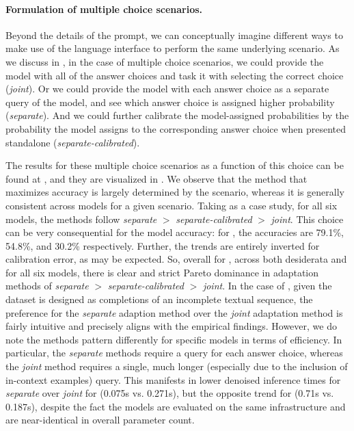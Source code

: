 \paragraph{Formulation of multiple choice scenarios.}
Beyond the details of the prompt, we can conceptually imagine different ways to make use of the language interface to perform the same underlying scenario.
As we discuss in , in the case of multiple choice scenarios, we could provide the model with all of the answer choices and task it with selecting the correct choice (\textit{joint}).
Or we could provide the model with each answer choice as a separate query of the model, and see which answer choice is assigned higher probability (\textit{separate}).
And we could further calibrate the model-assigned probabilities by the probability the model assigns to the corresponding answer choice when presented standalone (\textit{separate-calibrated}).

The results for these multiple choice scenarios as a function of this choice can be found at , and they are visualized in .
We observe that the method that maximizes accuracy is largely determined by the scenario, whereas it is generally consistent across models for a given scenario.
Taking \hellaswag as a case study, for all six models, the methods follow \textit{separate} $>$ \textit{separate-calibrated} $>$ \textit{joint}.
This choice can be very consequential for the model accuracy: for \optonesevenfive, the accuracies are 79.1\%, 54.8\%, and 30.2\% respectively. 
Further, the trends are entirely inverted for calibration error, as may be expected.
So, overall for \hellaswag, across both desiderata and for all six models, there is clear and strict Pareto dominance in adaptation methods of \textit{separate} $>$ \textit{separate-calibrated} $>$ \textit{joint}.
In the case of \hellaswag, given the dataset is designed as completions of an incomplete textual sequence, the preference for the \textit{separate} adaption method over the \textit{joint} adaptation method is fairly intuitive and precisely aligns with the empirical findings. 
However, we do note the methods pattern differently for specific models in terms of efficiency.
In particular, the \textit{separate} methods require a query for each answer choice, whereas the \textit{joint} method requires a single, much longer (especially due to the inclusion of in-context examples) query.
This manifests in lower denoised inference times for \textit{separate} over \textit{joint} for \bloom (0.075s vs. 0.271s), but the opposite trend for \optonesevenfive (0.71s vs. 0.187s), despite the fact the models are evaluated on the same infrastructure and are near-identical in overall parameter count.

